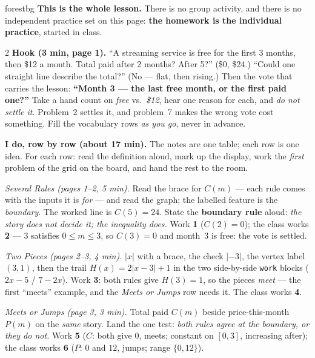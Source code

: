 \documentclass[10pt]{article}
\begin{document}
\boxguard
\begin{skillbox}{forestbg}
\textbf{This is the whole lesson.} There is no group activity, and there is no independent
practice set on this page: \textbf{the homework is the individual practice}, started in class.
\begin{multicols}{2}
\textbf{Hook (3 min, page 1).} ``A streaming service is free for the first 3 months, then \$12 a
month. Total paid after 2 months? After 5?'' (\$0, \$24.) ``Could one straight line describe the
total?'' (No --- flat, then rising.) Then the vote that carries the lesson: \textbf{``Month 3 ---
the last free month, or the first paid one?''} Take a hand count on \emph{free} vs.\ \emph{\$12},
hear one reason for each, and \emph{do not settle it}. Problem~2 settles it, and problem~7 makes
the wrong vote cost something. Fill the vocabulary rows \emph{as you go}, never in advance.

\textbf{I do, row by row (about 17 min).} The notes are one table; each row is one idea. For
each row: read the definition aloud, mark up the display, work the \emph{first} problem of the
grid on the board, and hand the rest to the room.

\emph{Several Rules (pages 1--2, 5 min).} Read the brace for $C(m)$ --- each rule comes with
the inputs it is \emph{for} --- and read the graph; the labelled feature is the \emph{boundary}.
The worked line is $C(5)=24$. State the \textbf{boundary rule} aloud: \emph{the story does not
decide it; the inequality does.} Work \textbf{1} ($C(2)=0$); the class works \textbf{2} --- $3$
satisfies $0\le m\le3$, so $C(3)=0$ and month~3 is free: the vote is settled.

\emph{Two Pieces (pages 2--3, 4 min).} $|x|$ with a brace, the check $|-3|$, the vertex label
$(3,1)$, then the trail $H(x)=2|x-3|+1$ in the two side-by-side \texttt{work} blocks ($2x-5$ /
$7-2x$). Work \textbf{3}: both rules give $H(3)=1$, so the pieces \emph{meet} --- the first
``meets'' example, and the \emph{Meets or Jumps} row needs it. The class works \textbf{4}.

\emph{Meets or Jumps (page 3, 3 min).} Total paid $C(m)$ beside price-this-month $P(m)$ on the
\emph{same} story. Land the one test: \emph{both rules agree at the boundary, or they do not.}
Work \textbf{5} ($C$: both give $0$, meets; constant on $[0,3]$, increasing after); the class
works \textbf{6} ($P$: $0$ and $12$, jumps; range $\{0,12\}$).


\end{multicols}
\end{skillbox}
\end{document}
